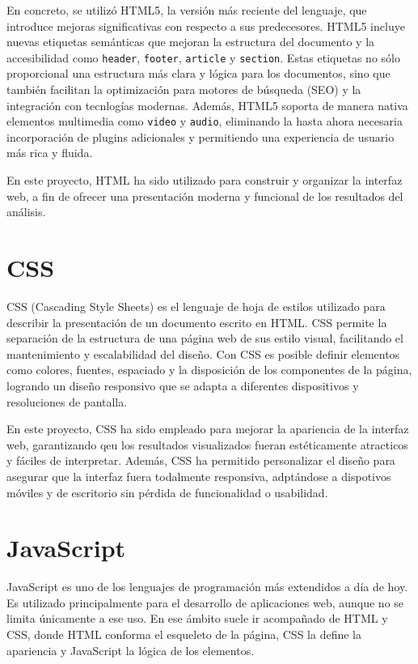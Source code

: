\documentclass[a4paper, 12pt]{book}
\begin{document}
En concreto, se utilizó HTML5, la versión más reciente del lenguaje, que introduce mejoras significativas con respecto a sus predecesores. HTML5 incluye nuevas etiquetas semánticas que mejoran la estructura del documento y la accesibilidad como \texttt{header}, \texttt{footer}, \texttt{article} y \texttt{section}. Estas etiquetas no sólo proporcional una estructura más clara y lógica para los documentos, sino que también facilitan la optimización para motores de búsqueda (SEO) y la integración con tecnlogías modernas. Además, HTML5 soporta de manera nativa elementos multimedia como \texttt{video} y \texttt{audio}, eliminando la hasta ahora necesaria incorporación de plugins adicionales y permitiendo una experiencia de usuario más rica y fluida.

En este proyecto, HTML ha sido utilizado para construir y organizar la interfaz web, a fin de ofrecer una presentación moderna y funcional de los resultados del análisis.

\section{CSS}
CSS (Cascading Style Sheets) es el lenguaje de hoja de estilos utilizado para describir la presentación de un documento escrito en HTML. CSS permite la separación de la estructura de una página web de sus estilo visual, facilitando el mantenimiento y escalabilidad del diseño. Con CSS es posible definir elementos como colores, fuentes, espaciado y la disposición de los componentes de la página, logrando un diseño responsivo que se adapta a diferentes dispositivos y resoluciones de pantalla.

En este proyecto, CSS ha sido empleado para mejorar la apariencia de la interfaz web, garantizando qeu los resultados visualizados fueran estéticamente atracticos y fáciles de interpretar. Además, CSS ha permitido personalizar el diseño para asegurar que la interfaz fuera todalmente responsiva, adptándose a dispotivos móviles y de escritorio sin pérdida de funcionalidad o usabilidad.

\section{JavaScript}
JavaScript es uno de los lenguajes de programación más extendidos a día de hoy. Es utilizado principalmente para el desarrollo de aplicaciones web, aunque no se limita únicamente a ese uso. En ese ámbito suele ir acompañado de HTML y CSS, donde HTML conforma el esqueleto de la página, CSS la define la apariencia y JavaScript la lógica de los elementos. 
\end{document}
